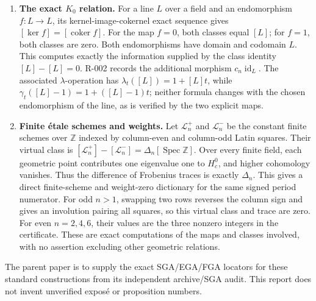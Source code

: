 \documentclass[
  10pt,
]{article}
\begin{document}
\begin{enumerate}
  is defined over \(\mathbb Z\). Its pullback on degree-\(d\) coordinate
  functions lands in separately degree-\(d\) functions, invariant under
  \(S_n\), and over \(\mathbb Q\) identifies with \(h_{d,n}\). The
  affine scheme-theoretic image has coordinate algebra
  \(\operatorname{im}\mu^*\); this realizes the Chow cone and gives
  \(\ker h_{d,n}=I(\mathrm{Chow}_n)_d\). Thus R-002 is an exact equation
  for the rank of the rectangular component of a morphism of coordinate
  algebras. For \(n=2,4,6\), the finite certificates prove rank one in
  that component. This coordinate-map assertion is also Kumar--Landsberg
  Lemma 1.5.
\item
  \textbf{The exact \(K_0\) relation.} For a line \(L\) over a field and
  an endomorphism \(f:L\to L\), its kernel-image-cokernel exact sequence
  gives \([\ker f]=[\operatorname{coker}f]\). For the map \(f=0\), both
  classes equal \([L]\); for \(f=1\), both classes are zero. Both
  endomorphisms have domain and codomain \(L\). This computes exactly
  the information supplied by the class identity \([L]-[L]=0\). R-002
  records the additional morphism \(c_n\operatorname{id}_L\). The
  associated \(\lambda\)-operation has \(\lambda_t([L])=1+[L]t\), while
  \(\gamma_t([L]-1)=1+([L]-1)t\); neither formula changes with the
  chosen endomorphism of the line, as is verified by the two explicit
  maps.
\item
  \textbf{Finite étale schemes and weights.} Let \(\mathcal L_n^+\) and
  \(\mathcal L_n^-\) be the constant finite schemes over \(\mathbb Z\)
  indexed by column-even and column-odd Latin squares. Their virtual
  class is
  \([\mathcal L_n^+]-[\mathcal L_n^-]=\Delta_n[\operatorname{Spec}\mathbb Z]\).
  Over every finite field, each geometric point contributes one
  eigenvalue one to \(H_c^0\), and higher cohomology vanishes. Thus the
  difference of Frobenius traces is exactly \(\Delta_n\). This gives a
  direct finite-scheme and weight-zero dictionary for the same signed
  period numerator. For odd \(n>1\), swapping two rows reverses the
  column sign and gives an involution pairing all squares, so this
  virtual class and trace are zero. For even \(n=2,4,6\), their values
  are the three nonzero integers in the certificate. These are exact
  computations of the maps and classes involved, with no assertion
  excluding other geometric relations.
\end{enumerate}

The parent paper is to supply the exact SGA/EGA/FGA locators for these
standard constructions from its independent archive/SGA audit. This
report does not invent unverified exposé or proposition numbers.
\end{document}
